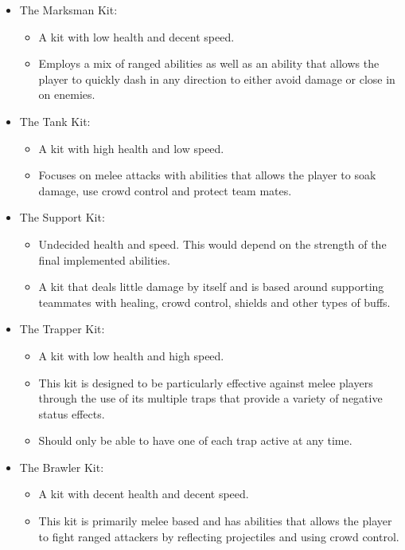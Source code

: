 \begin{itemize}
    \item The Marksman Kit:
    \begin{itemize}
        \item A kit with low health and decent speed.
        \item Employs a mix of ranged abilities as well as an ability that allows the player to quickly dash in any direction to either avoid damage or close in on enemies. 
    \end{itemize}
    
    \item The Tank Kit:
    \begin{itemize}
        \item A kit with high health and low speed. 
        \item Focuses on melee attacks with abilities that allows the player to soak damage, use crowd control and protect team mates.
    \end{itemize}
    
    \item The Support Kit:
    \begin{itemize}
        \item Undecided health and speed. This would depend on the strength of the final implemented abilities. 
        \item A kit that deals little damage by itself and is based around supporting teammates with healing, crowd control, shields and other types of buffs. 
    \end{itemize}
    
    \item The Trapper Kit:
    \begin{itemize}
        \item A kit with low health and high speed. 
        \item This kit is designed to be particularly effective against melee players through the use of its multiple traps that provide a variety of negative status effects. 
        \item Should only be able to have one of each trap active at any time. 
    \end{itemize}
    
    \item The Brawler Kit:
    \begin{itemize}
        \item A kit with decent health and decent speed.
        \item This kit is primarily melee based and has abilities that allows the player to fight ranged attackers by reflecting projectiles and using crowd control.  
    \end{itemize}
    

\end{itemize}
